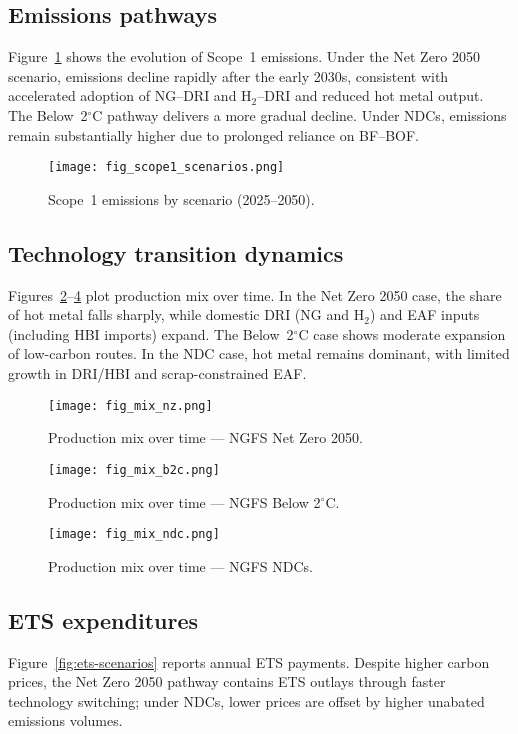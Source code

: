 \documentclass[preprint,5p,authoryear]{elsarticle}
\begin{document}
\subsection{Emissions pathways}
Figure~\ref{fig:scope1-scenarios} shows the evolution of Scope~1 emissions. Under the Net Zero 2050 scenario, emissions decline rapidly after the early 2030s, consistent with accelerated adoption of NG--DRI and H$_2$--DRI and reduced hot metal output. The Below~2$^\circ$C pathway delivers a more gradual decline. Under NDCs, emissions remain substantially higher due to prolonged reliance on BF--BOF.

\begin{figure}[!t]
  \centering
  \texttt{[image: fig\_scope1\_scenarios.png]}
  \caption{Scope~1 emissions by scenario (2025--2050).}
  \label{fig:scope1-scenarios}
\end{figure}

\subsection{Technology transition dynamics}
Figures~\ref{fig:mix-nz}--\ref{fig:mix-ndc} plot production mix over time. In the Net Zero 2050 case, the share of hot metal falls sharply, while domestic DRI (NG and H$_2$) and EAF inputs (including HBI imports) expand. The Below~2$^\circ$C case shows moderate expansion of low-carbon routes. In the NDC case, hot metal remains dominant, with limited growth in DRI/HBI and scrap-constrained EAF.

\begin{figure}[!t]
  \centering
  \texttt{[image: fig\_mix\_nz.png]}
  \caption{Production mix over time --- NGFS Net Zero 2050.}
  \label{fig:mix-nz}
\end{figure}

\begin{figure}[!t]
  \centering
  \texttt{[image: fig\_mix\_b2c.png]}
  \caption{Production mix over time --- NGFS Below 2$^\circ$C.}
  \label{fig:mix-b2c}
\end{figure}

\begin{figure}[!t]
  \centering
  \texttt{[image: fig\_mix\_ndc.png]}
  \caption{Production mix over time --- NGFS NDCs.}
  \label{fig:mix-ndc}
\end{figure}

\subsection{ETS expenditures}
Figure~\ref{fig:ets-scenarios} reports annual ETS payments. Despite higher carbon prices, the Net Zero 2050 pathway contains ETS outlays through faster technology switching; under NDCs, lower prices are offset by higher unabated emissions volumes.
\end{document}
